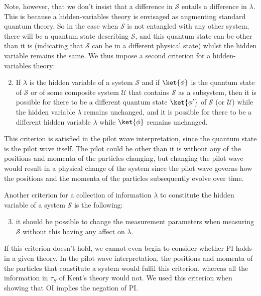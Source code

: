 Note, however, that we don't insist that a difference in $\mathcal{S}$ entails a difference in $\lambda$. This is because a hidden-variables theory is envisaged as augmenting standard quantum theory. So in the case when $\mathcal{S}$ is not entangled with any other system, there will be a quantum state describing $\mathcal{S}$, and this quantum state can be other than it is (indicating that $\mathcal{S}$ can be in a different physical state)  whilst the hidden variable remains the same. We thus impose a second criterion for a hidden-variables theory:
\begin{enumerate}
	\setcounter{enumi}{1}
	\item \label{hidden3} If $\lambda$ is the hidden variable of a system $\mathcal{S}$ and if $\ket{\phi}$ is the quantum state of $\mathcal{S}$ or of some composite system $\mathcal{U}$ that contains $\mathcal{S}$ as a subsystem, then it is possible for there to be a different quantum state $\ket{\phi'}$ of $\mathcal{S}$ (or $\mathcal{U}$) while the hidden variable $\lambda$ remains unchanged, and it is possible for there to be a different hidden variable $\lambda$ while $\ket{\phi}$ remains unchanged.
\end{enumerate}
This criterion is satisfied in the pilot wave interpretation, since the quantum state is the pilot wave itself. The pilot could be other than it is without any of the positions and momenta of the particles changing, but changing the pilot wave would result in a physical change of the system since the pilot wave governs how  the positions and the momenta of the particles subsequently evolve over time.

Another criterion for a collection of information $\lambda$ to constitute the hidden variable of a system $\mathcal{S}$ is the following: 
\begin{enumerate}
	\setcounter{enumi}{2}
\item \label{hidden2} it should be possible to change the measurement parameters when measuring $\mathcal{S}$ without this having any affect on $\lambda$. 
\end{enumerate} 
If this criterion doesn't hold, we cannot even begin to consider whether PI holds in a given theory. In the pilot wave interpretation, the positions and momenta of the particles that constitute a system would fulfil this criterion, whereas all the information in $\tau_S$ of Kent's theory would not. We used this criterion when showing that OI implies the negation of PI. 

